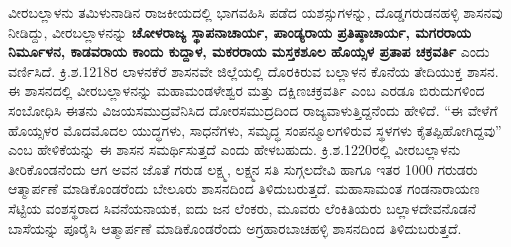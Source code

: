 ವೀರಬಲ್ಲಾಳನು ತಮಿಳುನಾಡಿನ ರಾಜಕೀಯದಲ್ಲಿ ಭಾಗವಹಿಸಿ ಪಡೆದ ಯಶಸ್ಸುಗಳನ್ನು, ದೊಡ್ಡಗರುಡನಹಳ್ಳಿ ಶಾಸನವು ನೀಡಿದ್ದು, ವೀರಬಲ್ಲಾಳನನ್ನು \textbf{ಚೋಳರಾಜ್ಯ ಸ್ಥಾಪನಾಚಾರ್ಯ, ಪಾಂಡ್ಯರಾಯ ಪ್ರತಿಷ್ಠಾಚಾರ್ಯ, ಮಗರರಾಯ ನಿರ್ಮೂಳನ, ಕಾಡವರಾಯ ಕಾಂದು ಕುದ್ದಾಳ, ಮಕರರಾಯ ಮಸ್ತಕಶೂಲ ಹೊಯ್ಸಳ ಪ್ರತಾಪ ಚಕ್ರವರ್ತಿ} ಎಂದು ವರ್ಣಿಸಿದೆ. ಕ್ರಿ.ಶ.1218ರ ಲಾಳನಕೆರೆ ಶಾಸನವೇ ಜಿಲ್ಲೆಯಲ್ಲಿ ದೊರಕಿರುವ ಬಲ್ಲಾಳನ ಕೊನೆಯ ತೇದಿಯುಕ್ತ ಶಾಸನ. ಈ ಶಾಸನದಲ್ಲಿ ವೀರಬಲ್ಲಾಳನನ್ನು ಮಹಾಮಂಡಳೇಶ್ವರ ಮತ್ತು ದಕ್ಷಿಣಚಕ್ರವರ್ತಿ ಎಂಬ ಎರಡೂ ಬಿರುದುಗಳಿಂದ ಸಂಬೋಧಿಸಿ ಈತನು ವಿಜಯಸಮುದ್ರವೆನಿಸಿದ ದೋರಸಮುದ್ರದಿಂದ ರಾಜ್ಯವಾಳುತ್ತಿದ್ದನೆಂದು ಹೇಳಿದೆ. “ಈ ವೇಳೆಗೆ ಹೊಯ್ಸಳರ ಮೊದಮೊದಲ ಯುದ್ಧಗಳು, ಸಾಧನೆಗಳು, ಸಮೃದ್ಧ ಸಂಪನ್ಮೂಲಗಳಿರುವ ಸ್ಥಳಗಳು ಕೈತಪ್ಪಿಹೋಗಿದ್ದವು” ಎಂಬ ಹೇಳಿಕೆಯನ್ನು ಈ ಶಾಸನ ಸಮರ್ಥಿಸುತ್ತದೆ ಎಂದು ಹೇಳಬಹುದು. ಕ್ರಿ.ಶ.1220ರಲ್ಲಿ ವೀರಬಲ್ಲಾಳನು ತೀರಿಕೊಂಡನೆಂದು ಆಗ ಅವನ ಜೊತೆ ಗರುಡ ಲಕ್ಷ್ಮ, ಲಕ್ಷ್ಮನ ಸತಿ ಸುಗ್ಗಲದೇವಿ ಹಾಗೂ ಇತರ 1000 ಗರುಡರು ಆತ್ಮಾರ್ಪಣೆ ಮಾಡಿಕೊಂಡರೆಂದು ಬೇಲೂರು ಶಾಸನ\-ದಿಂದ ತಿಳಿದುಬರುತ್ತದೆ. ಮಹಾಸಾಮಂತ ಗಂಡನಾರಾಯಣ ಸೆಟ್ಟಿಯ ವಂಶಸ್ಥರಾದ ಸಿವನೆಯನಾಯಕ, ಐದು ಜನ ಲೆಂಕರು, ಮೂವರು ಲೆಂಕಿತಿಯರು ಬಲ್ಲಾಳದೇವನೊಡನೆ ಬಾಸೆಯನ್ನು ಪೂರೈಸಿ ಆತ್ಮಾರ್ಪಣೆ ಮಾಡಿಕೊಂಡರೆಂದು ಅಗ್ರಹಾರಬಾಚಹಳ್ಳಿ ಶಾಸನದಿಂದ ತಿಳಿದುಬರುತ್ತದೆ.

